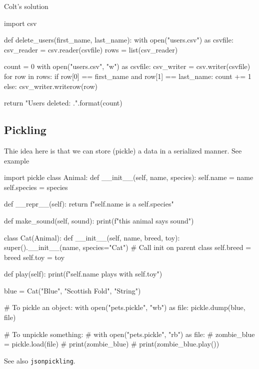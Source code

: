 Colt's solution
\begin{listing}{1}
import csv

def delete_users(first_name, last_name):
    with open("users.csv") as csvfile:
        csv_reader = csv.reader(csvfile)
        rows = list(csv_reader)
    
    count = 0
    with open("users.csv", "w") as csvfile:
        csv_writer = csv.writer(csvfile)
        for row in rows:
            if row[0] == first_name and row[1] == last_name:
                count += 1
            else:
                csv_writer.writerow(row)
    
    return "Users deleted: {}.".format(count)    
\end{listing}



\subsection{Pickling}

Thie idea here is that we can store (pickle) a data in a serialized manner. See example 
\begin{listing}{1}
import pickle
class Animal:
    def __init__(self, name, species):
        self.name = name
        self.species = species

    def __repr__(self):
        return f"{self.name} is a {self.species}"

    def make_sound(self, sound):
        print(f"this animal says {sound}")


class Cat(Animal):
    def __init__(self, name, breed, toy):
        super().__init__(name, species="Cat") # Call init on parent class
        self.breed = breed
        self.toy = toy

    def play(self):
        print(f"{self.name} plays with {self.toy}")


blue = Cat("Blue", "Scottish Fold", "String")

# To pickle an object:
with open("pets.pickle", "wb") as file:
    pickle.dump(blue, file)

# To unpickle something:
# with open("pets.pickle", "rb") as file:
# 	zombie_blue = pickle.load(file)
# 	print(zombie_blue)
# 	print(zombie_blue.play())    
\end{listing}

See also \verb|jsonpickling|.